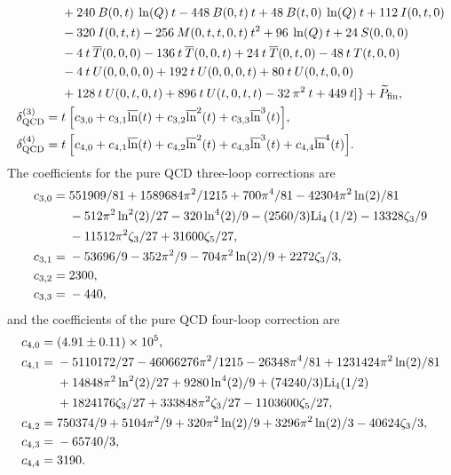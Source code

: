 \documentclass[a4paper,12pt]{book}
\begin{document}
\begin{appendices}
\begin{align}
\nonumber
&+240\> B(0,t)\> \ln(Q)\> t-448\>B(0,t) \>t+48\> B(t,0)\> \ln(Q)\> t+112\> I(0,t,0)\\
\nonumber
&-320\>I(0,t,t)-256\> M(0,t,t,0,t)\> t^2+96\> \ln(Q)\> t+24\> S(0,0,0)\\
\nonumber
&-4\> t\>
\overline{T}(0,0,0)-136\> t\> \overline{T}(0,0,t)+24\> t\> \overline{T}(0,t,0)-48\> t\>T(t,0,0)\\
\nonumber
&-4\> t\> U(0,0,0,0)+192\> t\> U(0,0,0,t)+80\> t\> U(0,t,0,0)\\
&+128\> t\> U(0,t,0,t)+896\> t\> U(t,0,t,t)-32\> \pi^2\> t+449\> t]\}+\widetilde{P}_\text{fin},\\
\delta^{(3)}_{\rm QCD} ={}& t\> \Bigl [c_{3,0} + c_{3,1} \overline{\ln}(t)
 + c_{3,2} \overline{\ln}^2(t) + c_{3,3} \overline{\ln}^3(t) \Bigr ],
\\
\delta^{(4)}_{\rm QCD}={}& t\> \Bigl [c_{4,0} + c_{4,1} \overline{\ln}(t)
 + c_{4,2} \overline{\ln}^2(t) + c_{4,3} \overline{\ln}^3(t) + c_{4,4} \overline{\ln}^4(t) \Bigr ].
\end{align}
The coefficients for the pure QCD three-loop corrections are
\begin{align}
c_{3,0} ={}& 551909/81 + 1589684 \pi^2/1215 + 
            700 \pi^4/81 - 42304 \pi^2 \ln(2)/81
\nonumber \\ 
&- 512 \pi^2 \ln^2(2)/27 
-320 \ln^4(2)/9 - (2560/3) {\rm Li}_4\left(1/2\right) - 13328 \zeta_3/9 
\nonumber \\ 
&- 11512 \pi^2 \zeta_3/27 
+ 31600 \zeta_5/27 ,
\\
c_{3,1} ={}& -53696/9 - 352 \pi^2/9 - 704 \pi^2 \ln(2)/9 + 2272 \zeta_3/3 ,
\\
c_{3,2} ={}& 2300 ,
\\
c_{3,3} ={}& -440 ,
\end{align}
and the coefficients of the pure QCD four-loop correction are
\begin{align}
c_{4,0} ={}& (4.91 \pm 0.11) \times 10^{5} ,
\\
c_{4,1} ={}&  -5110172/27 - 46066276 \pi^2/1215 - 26348 \pi^4/81 + 
1231424 \pi^2 \ln(2)/81
\nonumber \\ &
+ 14848 \pi^2 \ln^2(2)/27 + 9280 \ln^4(2)/9 + (74240/3) {\rm Li}_4(1/2)  
\nonumber \\ 
&+ 1824176 \zeta_3/27 + 333848 \pi^2 \zeta_3/27 - 1103600 \zeta_5/27,
\\
c_{4,2} ={}&  750374/9 + 5104 \pi^2/9 + 320 \pi^2 \ln(2)/9 + 3296 \pi^2 \ln(2)/3
- 40624 \zeta_3/3 ,
\\
c_{4,3} ={}& -65740/3 ,
\\
c_{4,4} ={}&  3190 .
\end{align} 
\end{appendices}
\end{document}
